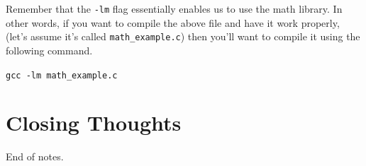 \documentclass[english, 10pt]{article}
\begin{document}
Remember that the \texttt{-lm} flag essentially enables us to use the math library. In other words, if you want to compile the above file and have it work properly, (let's assume it's called \texttt{math\_example.c}) then you'll want to compile it using the following command.\newline

\texttt{gcc -lm math\_example.c}



\section{Closing Thoughts}

End of notes.
\end{document}
